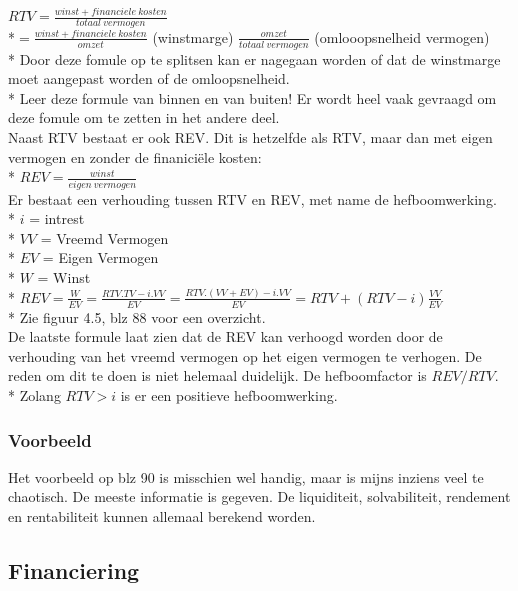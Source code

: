 \documentclass[12pt]{article}
\begin{document}
$RTV = \frac{winst + financiele\ kosten}{totaal\ vermogen}$\\*$= \frac{winst + financiele\ kosten}{omzet}$ (winstmarge) $\frac{omzet}{totaal\ vermogen}$ (omlooopsnelheid vermogen)\\*
Door deze fomule op te splitsen kan er nagegaan worden of dat de winstmarge moet aangepast worden of de omloopsnelheid.\\*
Leer deze formule van binnen en van buiten! Er wordt heel vaak gevraagd om deze fomule om te zetten in het andere deel.\\
Naast RTV bestaat er ook REV. Dit is hetzelfde als RTV, maar dan met eigen vermogen en zonder de finanici\"ele kosten:\\*
$REV = \frac{winst}{eigen\ vermogen}$\\
Er bestaat een verhouding tussen RTV en REV, met name de hefboomwerking.\\*
$i$ = intrest\\*
$VV$ = Vreemd Vermogen\\*
$EV$ = Eigen Vermogen\\*
$W$ = Winst\\*
$REV = \frac{W}{EV} = \frac{RTV.TV-i.VV}{EV} = \frac{RTV.(VV+EV)-i.VV}{EV} = RTV + (RTV-i)\frac{VV}{EV}$\\*
Zie figuur 4.5, blz 88 voor een overzicht.\\
De laatste formule laat zien dat de REV kan verhoogd worden door de verhouding van het vreemd vermogen op het eigen vermogen te verhogen. De reden om dit te doen is niet helemaal duidelijk. De hefboomfactor is $REV/RTV$.\\*
Zolang $RTV > i$ is er een positieve hefboomwerking.
\subsubsection{Voorbeeld}
Het voorbeeld op blz 90 is misschien wel handig, maar is mijns inziens veel te chaotisch. De meeste informatie is gegeven. De liquiditeit, solvabiliteit, rendement en rentabiliteit kunnen allemaal berekend worden.
\subsection{Financiering}
\end{document}
